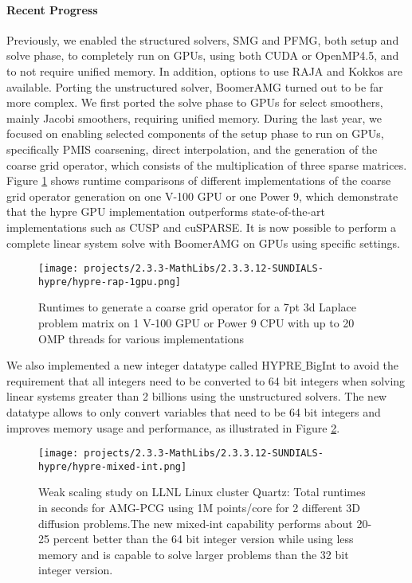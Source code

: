 \paragraph{Recent Progress}

Previously, we enabled the structured solvers, SMG and PFMG\cite{AsFa1996}, both setup and solve phase, to completely run on GPUs, using both CUDA or OpenMP4.5, and to not require unified memory. In addition, options to use RAJA and Kokkos are available.
Porting the unstructured solver, BoomerAMG turned out to be far more complex. We first ported the solve phase to GPUs for select smoothers, mainly Jacobi smoothers, requiring unified memory. During the last year, we focused on enabling selected components of the setup phase to run on GPUs, specifically PMIS coarsening, direct interpolation, and the generation of the coarse grid operator, which consists of the multiplication of three sparse matrices. Figure \ref{fig:rap} shows runtime comparisons of different implementations of the coarse grid operator generation on one V-100 GPU or one Power 9, which demonstrate that the hypre GPU implementation outperforms state-of-the-art implementations such as CUSP and cuSPARSE. It is now possible to perform a complete linear system solve with BoomerAMG on GPUs using specific settings.

\begin{figure}
\centering
	\texttt{[image: projects/2.3.3-MathLibs/2.3.3.12-SUNDIALS-hypre/hypre-rap-1gpu.png]}
	\caption{\label{fig:rap} Runtimes to generate a coarse grid operator for a 7pt 3d Laplace problem matrix on 1 V-100 GPU or Power 9 CPU with up to 20 OMP threads for various implementations}
\end{figure}

We also implemented a new integer datatype called HYPRE$\_$BigInt to avoid the requirement that all integers need to be converted to 64 bit integers when solving linear systems greater than 2 billions using the unstructured solvers. The new datatype allows to only convert variables that need to be 64 bit integers and improves memory usage and performance, as illustrated in Figure \ref{fig:mixed-int}.

\begin{figure}
\centering
	\texttt{[image: projects/2.3.3-MathLibs/2.3.3.12-SUNDIALS-hypre/hypre-mixed-int.png]}
	\caption{\label{fig:mixed-int} Weak scaling study on LLNL Linux cluster Quartz: Total runtimes in seconds for AMG-PCG using 1M points/core for 2 different 3D diffusion problems.The new mixed-int capability performs about 20-25 percent better than the 64 bit integer version while using less memory and is capable to solve larger problems than the 32 bit integer version.}
\end{figure}


